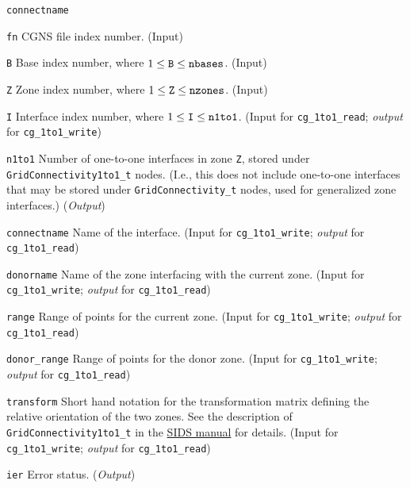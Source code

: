 \begin{Ventryi}{\texttt{connectname}}\raggedright
\item [\texttt{fn}]
      CGNS file index number.
      (\textcolor{input}{Input})
\item [\texttt{B}]
      Base index number, where $1 \leq \text{\texttt{B}} \leq \text{\texttt{nbases}}$.
      (\textcolor{input}{Input})
\item [\texttt{Z}]
      Zone index number, where $1 \leq \text{\texttt{Z}} \leq \text{\texttt{nzones}}$.
      (\textcolor{input}{Input})
\item [\texttt{I}]
      Interface index number, where $1 \leq \text{\texttt{I}} \leq \text{\texttt{n1to1}}$.
      (\textcolor{input}{Input} for \texttt{cg\_1to1\_read};
      \textcolor{output}{\textit{output}} for \texttt{cg\_1to1\_write})
\item [\texttt{n1to1}]
      Number of one-to-one interfaces in zone \texttt{Z}, stored under
      \texttt{GridConnectivity1to1\_t} nodes.
      (I.e., this does not include one-to-one interfaces that may be
      stored under \texttt{GridConnectivity\_t} nodes, used for
      generalized zone interfaces.)
      (\textcolor{output}{\textit{Output}})
\item [\texttt{connectname}]
      Name of the interface.
      (\textcolor{input}{Input} for \texttt{cg\_1to1\_write};
      \textcolor{output}{\textit{output}} for \texttt{cg\_1to1\_read})
\item [\texttt{donorname}]
      Name of the zone interfacing with the current zone.
      (\textcolor{input}{Input} for \texttt{cg\_1to1\_write};
      \textcolor{output}{\textit{output}} for \texttt{cg\_1to1\_read})
\item [\texttt{range}]
      Range of points for the current zone.
      (\textcolor{input}{Input} for \texttt{cg\_1to1\_write};
      \textcolor{output}{\textit{output}} for \texttt{cg\_1to1\_read})
\item [\texttt{donor\_range}]
      Range of points for the donor zone.
      (\textcolor{input}{Input} for \texttt{cg\_1to1\_write};
      \textcolor{output}{\textit{output}} for \texttt{cg\_1to1\_read})
\item [\texttt{transform}]
      Short hand notation for the transformation matrix defining the
      relative orientation of the two zones.
      See the description of \texttt{GridConnectivity1to1\_t} in the
      \href{../sids/sids.pdf}{SIDS manual} for details.
      (\textcolor{input}{Input} for \texttt{cg\_1to1\_write};
      \textcolor{output}{\textit{output}} for \texttt{cg\_1to1\_read})
\item [\texttt{ier}]
      Error status.
      (\textcolor{output}{\textit{Output}})
\end{Ventryi}

